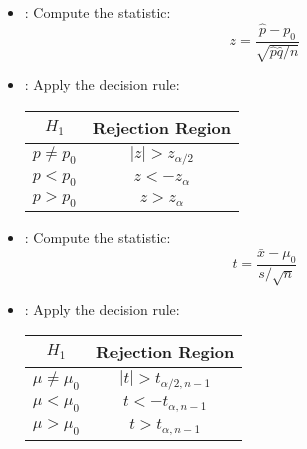 \begin{multicols*}{3}
    \begin{itemize}
      \item {}: Compute the statistic:
        \[
          z = \frac{\hat{p} - p_0}{\sqrt{\hat{p}\hat{q}/n}}
        \]
      \item {}: Apply the decision rule:
        \begin{center}
          \begin{tabular}{|c|c|}
            \hline
            \textbf{$H_1$}   & \textbf{Rejection Region} \\ \hline
            $p \neq p_0$ & $|z| > z_{\alpha/2}$      \\ \hline
            $p < p_0$    & $z < -z_{\alpha}$         \\ \hline
            $p > p_0$    & $z > z_{\alpha}$          \\ \hline
          \end{tabular}
        \end{center}
    \end{itemize}


\begin{itemize}
  \item {}: Compute the statistic:
    \[
      t = \frac{\bar{x} - \mu_0}{s / \sqrt{n}}
    \]
  \item {}: Apply the decision rule:
      \begin{center}
        \begin{tabular}{|c|c|}
          \hline
          \textbf{$H_1$}   & \textbf{Rejection Region}   \\ \hline
          $\mu \neq \mu_0$ & $|t| > t_{\alpha/2, n - 1}$ \\ \hline
          $\mu < \mu_0$    & $t < -t_{\alpha, n - 1}$    \\ \hline
          $\mu > \mu_0$    & $t > t_{\alpha, n - 1}$     \\ \hline
        \end{tabular}
      \end{center}
\end{itemize}



\end{multicols*}
